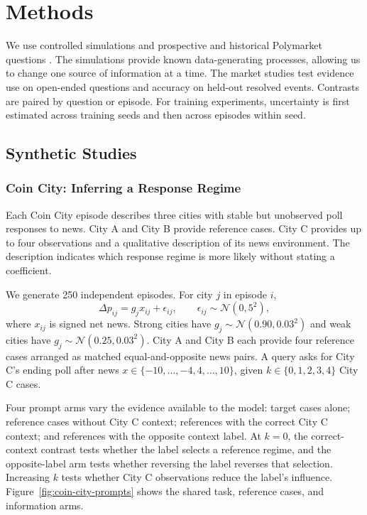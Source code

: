 \section{Methods}
\label{sec:methods}

We use controlled simulations and prospective and historical Polymarket
questions \citep{gentzel2019case,polymarket2026docs}. The simulations provide known
data-generating processes, allowing us to change one source of information at a
time. The market studies test evidence use on open-ended questions and accuracy on
held-out resolved events. Contrasts are paired by question or episode. For training
experiments, uncertainty is first estimated across training seeds and then across
episodes within seed.

\subsection{Synthetic Studies}
\label{sec:methods-synthetic}

\subsubsection{Coin City: Inferring a Response Regime}
\label{sec:methods-coin-city}

Each Coin City episode describes three cities with stable but unobserved poll
responses to news. City A and City B provide reference cases. City C provides up to
four observations and a qualitative description of its news environment. The
description indicates which response regime is more likely without stating a
coefficient.

We generate 250 independent episodes. For city $j$ in episode $i$,
\begin{equation}
  \Delta p_{ij}=g_jx_{ij}+\epsilon_{ij},
  \qquad \epsilon_{ij}\sim\mathcal N(0,5^2),
  \label{eq:coin-city-dgp}
\end{equation}
where $x_{ij}$ is signed net news. Strong cities have
$g_j\sim\mathcal N(0.90,0.03^2)$ and weak cities have
$g_j\sim\mathcal N(0.25,0.03^2)$. City A and City B each provide four reference
cases arranged as matched equal-and-opposite news pairs. A query asks for City C's
ending poll after news $x\in\{-10,\ldots,-4,4,\ldots,10\}$, given
$k\in\{0,1,2,3,4\}$ City C cases.

Four prompt arms vary the evidence available to the model: target cases alone;
reference cases without City C context; references with the correct City C context;
and references with the opposite context label. At $k=0$, the correct-context
contrast tests whether the label selects a reference regime, and the opposite-label
arm tests whether reversing the label reverses that selection. Increasing $k$ tests
whether City C observations reduce the label's influence.
Figure~\ref{fig:coin-city-prompts} shows the shared task, reference cases, and
information arms.


